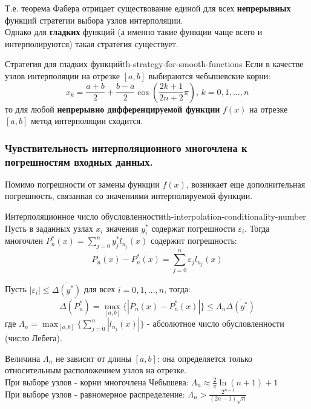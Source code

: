\documentclass[14pt]{extarticle}
\begin{document}
        Т.е. теорема Фабера отрицает существование единой для всех \textbf{непрерывных} функций стратегии выбора узлов интерполяции.\\
        Однако для \textbf{гладких} функций (а именно такие функции чаще всего и интерполируются) такая стратегия существует.

        \begin{theorem}{Стратегия для гладких функций}{th-strategy-for-smooth-functions}
            Если в качестве узлов интерполяции на отрезке $[a, b]$ выбираются чебышевские корни:
            $$x_{k} = \frac{a+b}{2} + \frac{b - a}{2}\cos(\frac{2k + 1}{2n + 2}\pi) \text{, } k = 0, 1, \ldots, n$$
            то для любой \textbf{непрерывно дифференцируемой функции} $f(x)$ на отрезке $[a, b]$ метод интерполяции сходится.
        \end{theorem}

    \clearpage
    \subsubsection{Чувствительность интерполяционного многочлена к погрешностям входных данных.}

        Помимо погрешности от замены функции $f(x)$, возникает еще дополнительная погрешность, связанная со значениями интерполируемой функции.

        \begin{theorem}{Интерполяционное число обусловленности}{th-interpolation-conditionality-number}
            Пусть в заданных узлах $x_{i}$ значения $y_{i}^{*}$ содержат погрешности $\varepsilon_{i}$. Тогда многочлен $P_{n}^{*}(x) = \sum_{j = 0}^{n} y_{j}^{*} l_{n_{j}}(x)$ содержит погрешность:
            $$P_{n}(x) - P_{n}^{*}(x) = \sum_{j = 0}^{n} \varepsilon_{j}l_{n_{j}}(x)$$

            Пусть $|\varepsilon_{i}| \leq \overline{\Delta(y^{*})}$ для всех $i = 0, 1, \ldots, n$, тогда:
            $$\overline{\Delta(P_{n}^{*})} = \max_{[a, b]}\{|P_{n}(x) - P_{n}^{*}(x)|\} \leq \Lambda_{n}\overline{\Delta(y^{*})}$$
            где $\Lambda_{n} = \max_{[a, b]}\{\sum_{j = 0}^{n}|l_{n_{j}}(x)|\}$ - абсолютное число обусловленности (число Лебега).

            \vspace{\baselineskip}

            Величина $\Lambda_{n}$ не зависит от длины $[a, b]$: она определяется только относительным расположением узлов на отрезке.\\
            При выборе узлов - корни многочлена Чебышева: $\Lambda_{n} \approx \frac{2}{\pi}\ln(n + 1) + 1$\\
            При выборе узлов - равномерное распределение: $\Lambda_{n} > \frac{2^{n - 1}}{(2n - 1)\sqrt{n}}$\\
        \end{theorem}
\end{document}
